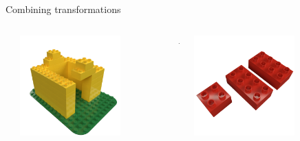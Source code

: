 \begin{frame}{Combining transformations}
    \begin{columns}[c]
        \begin{column}{0.05\textwidth}
        \end{column}\begin{column}{0.3\textwidth}
            \centering
            \includegraphics[width=0.7\textwidth]{images/03_transformation_framework/duplo_house_roofless.png}
        \end{column}\begin{column}{0.05\textwidth}
            \centering
            +
        \end{column}\begin{column}{0.2\textwidth}
            \centering
            \includegraphics[width=0.7\textwidth]{images/03_transformation_framework/duplo_roof_pieces.png}
        \end{column}\begin{column}{0.05\textwidth}

\end{column}
\end{columns}
\end{frame}
